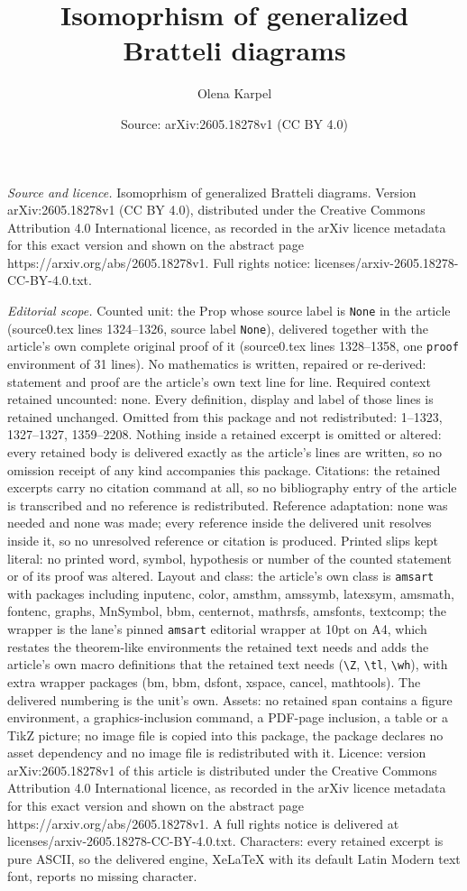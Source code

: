 \documentclass[10pt,a4paper]{amsart}
\title[Isomoprhism of generalized Bratteli diagrams]{Isomoprhism of generalized Bratteli diagrams}
\author{Olena Karpel}
\date{Source: arXiv:2605.18278v1 (CC BY 4.0)}
\begin{document}
\maketitle

\noindent\emph{Source and licence.} Isomoprhism of generalized Bratteli diagrams. Version arXiv:2605.18278v1 (CC BY 4.0), distributed under the Creative Commons Attribution 4.0 International licence, as recorded in the arXiv licence metadata for this exact version and shown on the abstract page https://arxiv.org/abs/2605.18278v1. Full rights notice: licenses/arxiv-2605.18278-CC-BY-4.0.txt.\par\smallskip

\noindent\textit{Editorial scope.} Counted unit: the Prop whose source label is \texttt{None} in the article (source0.tex lines 1324--1326, source label \texttt{None}), delivered together with the article's own complete original proof of it (source0.tex lines 1328--1358, one \texttt{proof} environment of 31 lines). No mathematics is written, repaired or re-derived: statement and proof are the article's own text line for line. Required context retained uncounted: none. Every definition, display and label of those lines is retained unchanged. Omitted from this package and not redistributed: 1--1323, 1327--1327, 1359--2208. Nothing inside a retained excerpt is omitted or altered: every retained body is delivered exactly as the article's lines are written, so no omission receipt of any kind accompanies this package. Citations: the retained excerpts carry no citation command at all, so no bibliography entry of the article is transcribed and no reference is redistributed. Reference adaptation: none was needed and none was made; every reference inside the delivered unit resolves inside it, so no unresolved reference or citation is produced. Printed slips kept literal: no printed word, symbol, hypothesis or number of the counted statement or of its proof was altered. Layout and class: the article's own class is \texttt{amsart} with packages including inputenc, color, amsthm, amssymb, latexsym, amsmath, fontenc, graphs, MnSymbol, bbm, centernot, mathrsfs, amsfonts, textcomp; the wrapper is the lane's pinned \texttt{amsart} editorial wrapper at 10pt on A4, which restates the theorem-like environments the retained text needs and adds the article's own macro definitions that the retained text needs (\texttt{\textbackslash Z}, \texttt{\textbackslash tl}, \texttt{\textbackslash wh}), with extra wrapper packages (bm, bbm, dsfont, xspace, cancel, mathtools). The delivered numbering is the unit's own. Assets: no retained span contains a figure environment, a graphics-inclusion command, a PDF-page inclusion, a table or a TikZ picture; no image file is copied into this package, the package declares no asset dependency and no image file is redistributed with it. Licence: version arXiv:2605.18278v1 of this article is distributed under the Creative Commons Attribution 4.0 International licence, as recorded in the arXiv licence metadata for this exact version and shown on the abstract page https://arxiv.org/abs/2605.18278v1. A full rights notice is delivered at licenses/arxiv-2605.18278-CC-BY-4.0.txt. Characters: every retained excerpt is pure ASCII, so the delivered engine, XeLaTeX with its default Latin Modern text font, reports no missing character.
\end{document}
